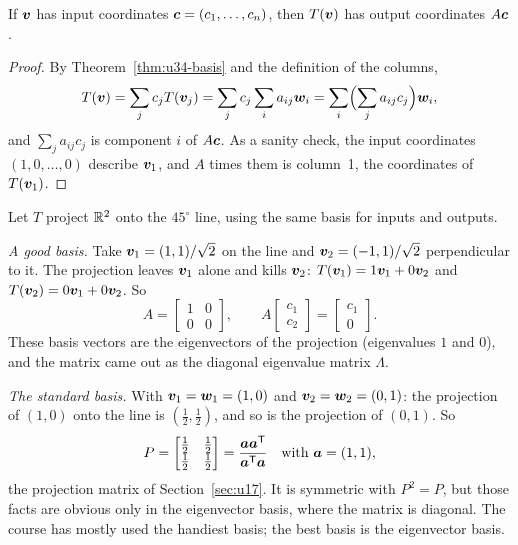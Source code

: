 \begin{theorem}\label{thm:u34-matrix}
If $\boldsymbol{v}$ has input coordinates $\boldsymbol{c}=(c_1,\dots,c_n)$, then $T(\boldsymbol{v})$ has output coordinates $A\boldsymbol{c}$.
\end{theorem}
\begin{proof}
By Theorem~\ref{thm:u34-basis} and the definition of the columns,
\[
  T(\boldsymbol{v})=\sum_{j}c_jT(\boldsymbol{v}_j)=\sum_{j}c_j\sum_{i}a_{ij}\boldsymbol{w}_i=\sum_{i}\Bigl(\sum_{j}a_{ij}c_j\Bigr)\boldsymbol{w}_i ,
\]
and $\sum_ja_{ij}c_j$ is component $i$ of $A\boldsymbol{c}$. As a sanity check, the input coordinates
$(1,0,\dots,0)$ describe $\boldsymbol{v}_1$, and $A$ times them is column~1, the coordinates of $T(\boldsymbol{v}_1)$.
\end{proof}

\begin{example}\label{ex:u34-projection}
Let $T$ project $\mathbb{R}^2$ onto the $45^\circ$ line, using the same basis for inputs and outputs.

\emph{A good basis.} Take $\boldsymbol{v}_1=(1,1)/\sqrt2$ on the line and $\boldsymbol{v}_2=(-1,1)/\sqrt2$ perpendicular to
it. The projection leaves $\boldsymbol{v}_1$ alone and kills $\boldsymbol{v}_2$: $T(\boldsymbol{v}_1)=1\boldsymbol{v}_1+0\boldsymbol{v}_2$ and
$T(\boldsymbol{v}_2)=0\boldsymbol{v}_1+0\boldsymbol{v}_2$. So
\[
  A=\begin{bmatrix}1&0\\0&0\end{bmatrix},\qquad A\begin{bmatrix}c_1\\c_2\end{bmatrix}=\begin{bmatrix}c_1\\0\end{bmatrix}.
\]
These basis vectors are the eigenvectors of the projection (eigenvalues $1$ and $0$), and the
matrix came out as the diagonal eigenvalue matrix $\Lambda$.

\emph{The standard basis.} With $\boldsymbol{v}_1=\boldsymbol{w}_1=(1,0)$ and $\boldsymbol{v}_2=\boldsymbol{w}_2=(0,1)$: the projection of $(1,0)$
onto the line is $(\tfrac12,\tfrac12)$, and so is the projection of $(0,1)$. So
\[
  P=\begin{bmatrix}\tfrac12&\tfrac12\\\tfrac12&\tfrac12\end{bmatrix}=\frac{\boldsymbol{a}\boldsymbol{a}^{\mathsf{T}}}{\boldsymbol{a}^{\mathsf{T}}\boldsymbol{a}}\quad\text{with }\boldsymbol{a}=(1,1),
\]
the projection matrix of Section~\ref{sec:u17}. It is symmetric with $P^2=P$, but those facts are
obvious only in the eigenvector basis, where the matrix is diagonal. The course has mostly used
the handiest basis; the best basis is the eigenvector basis.
\end{example}

